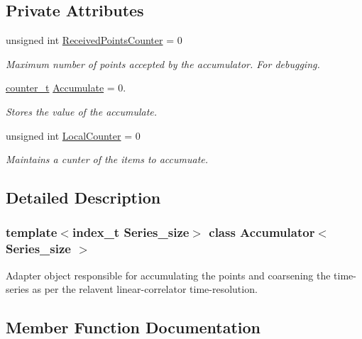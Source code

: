 \subsection*{Private Attributes}
\begin{DoxyCompactItemize}
\item 
unsigned int \hyperlink{classAccumulator_a7c73ca34e36c1bf882aebe96187f30bb}{Received\+Points\+Counter} = 0
\begin{DoxyCompactList}\small\item\em Maximum number of points accepted by the accumulator. For debugging. \end{DoxyCompactList}\item 
\hyperlink{types_8hpp_a22f279793847eba127de149437848c48}{counter\+\_\+t} \hyperlink{classAccumulator_a5b21e86275e8a4fb3223ddbd3d9d09fc}{Accumulate} = 0.
\begin{DoxyCompactList}\small\item\em Stores the value of the accumulate. \end{DoxyCompactList}\item 
unsigned int \hyperlink{classAccumulator_a3eca18da4beff6509551889f43e07633}{Local\+Counter} = 0
\begin{DoxyCompactList}\small\item\em Maintains a cunter of the items to accumuate. \end{DoxyCompactList}\end{DoxyCompactItemize}


\subsection{Detailed Description}
\subsubsection*{template$<$index\+\_\+t Series\+\_\+size$>$\newline
class Accumulator$<$ Series\+\_\+size $>$}

Adapter object responsible for accumulating the points and coarsening the time-\/series as per the relavent linear-\/correlator time-\/resolution. 

\subsection{Member Function Documentation}
\mbox{\label{classAccumulator_a58b1133059f8c92fe6f5f0b229de668f}} 
